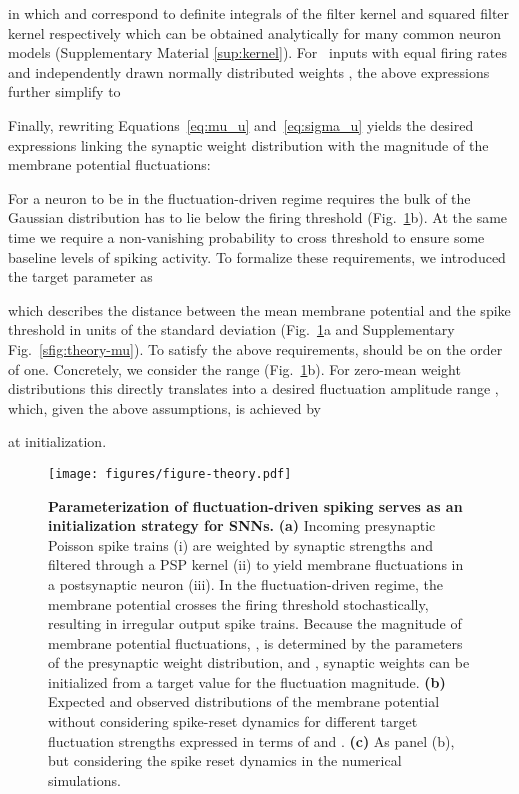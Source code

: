 \documentclass[11pt,a4paper]{article}
\begin{document}
in which  and  correspond to definite integrals
of the filter kernel and squared filter kernel respectively which can be obtained analytically for many common neuron
models (Supplementary Material \ref{sup:kernel}).
For ~inputs with equal firing rates 
and independently
drawn normally distributed weights , the above expressions further simplify to

Finally, rewriting Equations~\eqref{eq:mu_u} and~\eqref{eq:sigma_u} yields the
desired expressions linking the synaptic weight distribution with the magnitude
of the membrane potential fluctuations:


For a neuron to be in the fluctuation-driven regime requires the bulk of the
Gaussian distribution has to lie below the firing threshold
(Fig.~\ref{fig:theory}b).
At the same time we require a non-vanishing probability to cross threshold to
ensure some baseline levels of spiking activity.
To formalize these requirements, we introduced the target parameter  as 
 
which describes the distance between the mean membrane potential  
and the spike threshold  in units of the standard deviation 
(Fig.~\ref{fig:theory}a and Supplementary Fig.~\ref{sfig:theory-mu}).
To satisfy the above requirements,  should be on the order of one.
Concretely, we consider the range  (Fig.~\ref{fig:theory}b).
For zero-mean weight distributions this directly translates into 
a desired fluctuation amplitude range ,
which, given the above assumptions, is achieved by

at initialization.

\begin{figure}[tbh]
\texttt{[image: figures/figure-theory.pdf]}
    \caption{
    \textbf{Parameterization of fluctuation-driven spiking serves as
an initialization strategy for \acp{SNN}.} 
\textbf{(a)} Incoming presynaptic Poisson spike trains (i) are weighted by
synaptic strengths  and filtered through a \ac{PSP} kernel 
(ii) to yield membrane fluctuations  in a postsynaptic neuron (iii). 
In the fluctuation-driven regime, the membrane potential crosses the firing
threshold  stochastically, resulting in irregular output spike trains.
Because the magnitude of membrane potential fluctuations, , is
determined by the parameters of the presynaptic weight distribution, 
and , synaptic weights can be initialized from a target value for the
fluctuation magnitude.
\textbf{(b)} Expected and observed distributions of the membrane potential
without considering spike-reset dynamics for different target fluctuation
strengths expressed in terms of  and . 
\textbf{(c)} As panel (b), but considering the
spike reset dynamics in the numerical simulations.
}
\label{fig:theory}
\end{figure}
\end{document}
